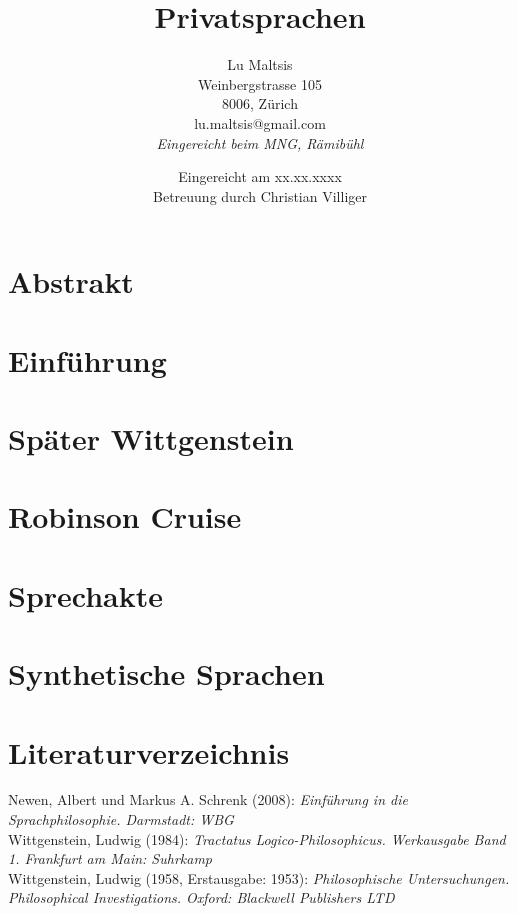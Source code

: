 \documentclass[a4paper,12pt]{article}
\begin{document}
\title{\Large{\textbf{Privatsprachen}}}
\author{Lu Maltsis \\
Weinbergstrasse 105 \\
8006, Zürich \\
lu.maltsis@gmail.com \\
\textit{Eingereicht beim MNG, Rämibühl}
}
\date{Eingereicht am xx.xx.xxxx \\
\vspace{10mm}
Betreuung durch Christian Villiger}
\maketitle
\newpage


\section{Abstrakt}
\blindtext[1]

\tableofcontents{}

\section{Einführung}
\blindtext[1]

\section{Später Wittgenstein}
\blindtext[1]

\section{Robinson Cruise}
\blindtext[1]

\section{Sprechakte}
\blindtext[1]

\section{Synthetische Sprachen}
\blindtext[1]

\section*{Literaturverzeichnis}
Newen, Albert und Markus A. Schrenk (2008): \textit{Einführung in die Sprachphilosophie. Darmstadt: WBG} \\
Wittgenstein, Ludwig (1984): \textit{Tractatus Logico-Philosophicus.
Werkausgabe Band 1. Frankfurt am Main: Suhrkamp} \\
Wittgenstein, Ludwig (1958, Erstausgabe: 1953): \textit{Philosophische Untersuchungen. Philosophical Investigations. Oxford: Blackwell Publishers LTD} \\
\end{document}
